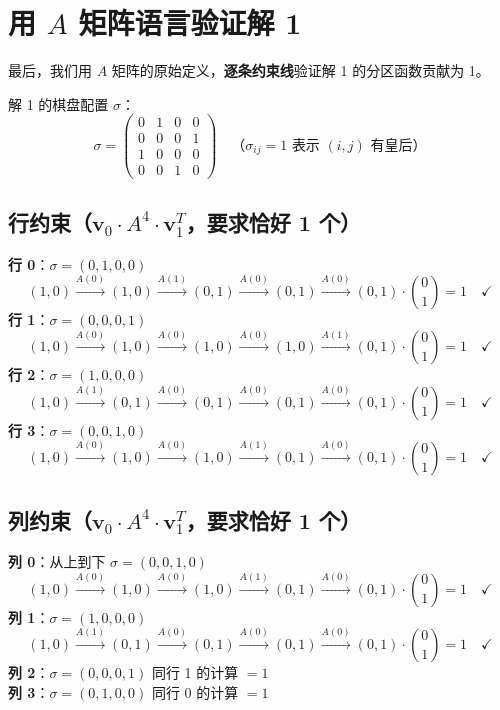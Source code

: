 \documentclass[12pt,a4paper]{article}
\newcommand{\bv}[1]{\boldsymbol{#1}}
\begin{document}
\section{用 $A$ 矩阵语言验证解 1}

最后，我们用 $A$ 矩阵的原始定义，\textbf{逐条约束线}验证解 1 的分区函数贡献为 1。

解 1 的棋盘配置 $\sigma$：
\[
\sigma = \begin{pmatrix}
0 & 1 & 0 & 0 \\
0 & 0 & 0 & 1 \\
1 & 0 & 0 & 0 \\
0 & 0 & 1 & 0
\end{pmatrix}
\quad \text{（$\sigma_{ij} = 1$ 表示 $(i,j)$ 有皇后）}
\]

\subsection{行约束（$\bv{v}_0 \cdot A^4 \cdot \bv{v}_1^T$，要求恰好 1 个）}

\begin{exbox}[4 条行约束]
\textbf{行 0}：$\sigma = (0,1,0,0)$
\[
(1,0) \xrightarrow{A(0)} (1,0) \xrightarrow{A(1)} (0,1) \xrightarrow{A(0)} (0,1) \xrightarrow{A(0)} (0,1) \cdot \binom{0}{1} = 1 \quad \checkmark
\]
\textbf{行 1}：$\sigma = (0,0,0,1)$
\[
(1,0) \xrightarrow{A(0)} (1,0) \xrightarrow{A(0)} (1,0) \xrightarrow{A(0)} (1,0) \xrightarrow{A(1)} (0,1) \cdot \binom{0}{1} = 1 \quad \checkmark
\]
\textbf{行 2}：$\sigma = (1,0,0,0)$
\[
(1,0) \xrightarrow{A(1)} (0,1) \xrightarrow{A(0)} (0,1) \xrightarrow{A(0)} (0,1) \xrightarrow{A(0)} (0,1) \cdot \binom{0}{1} = 1 \quad \checkmark
\]
\textbf{行 3}：$\sigma = (0,0,1,0)$
\[
(1,0) \xrightarrow{A(0)} (1,0) \xrightarrow{A(0)} (1,0) \xrightarrow{A(1)} (0,1) \xrightarrow{A(0)} (0,1) \cdot \binom{0}{1} = 1 \quad \checkmark
\]
\end{exbox}

\subsection{列约束（$\bv{v}_0 \cdot A^4 \cdot \bv{v}_1^T$，要求恰好 1 个）}

\begin{exbox}[4 条列约束]
\textbf{列 0}：从上到下 $\sigma = (0,0,1,0)$
\[
(1,0) \xrightarrow{A(0)} (1,0) \xrightarrow{A(0)} (1,0) \xrightarrow{A(1)} (0,1) \xrightarrow{A(0)} (0,1) \cdot \binom{0}{1} = 1 \quad \checkmark
\]
\textbf{列 1}：$\sigma = (1,0,0,0)$
\[
(1,0) \xrightarrow{A(1)} (0,1) \xrightarrow{A(0)} (0,1) \xrightarrow{A(0)} (0,1) \xrightarrow{A(0)} (0,1) \cdot \binom{0}{1} = 1 \quad \checkmark
\]
\textbf{列 2}：$\sigma = (0,0,0,1)$ \quad 同行 1 的计算 $= 1$ \quad \checkmark \\[3pt]
\textbf{列 3}：$\sigma = (0,1,0,0)$ \quad 同行 0 的计算 $= 1$ \quad \checkmark
\end{exbox}
\end{document}
